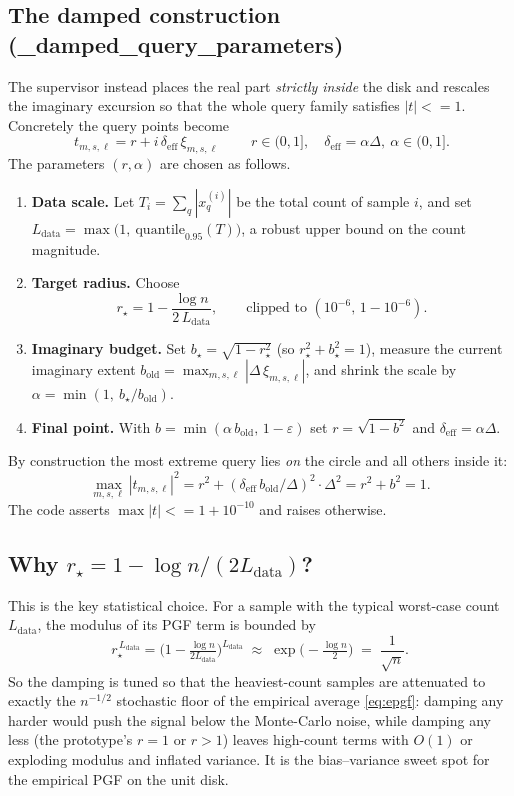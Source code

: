 \documentclass[11pt]{article}
\newcommand{\bt}{\bm{t}}
\newcommand{\bxi}{\bm{\xi}}
\newcommand{\deff}{\delta_{\mathrm{eff}}}
\newcommand{\code}[1]{\texttt{\small #1}}
\def\code#1{#1}%
\def\small{}%
\def\bm#1{#1}%
\def\bt{t}%
\def\le{<=}%
\theoremstyle{definition}
\begin{document}
\subsection{The damped construction (\code{\_damped\_query\_parameters})}
The supervisor instead places the real part \emph{strictly inside} the disk and rescales the
imaginary excursion so that the whole query family satisfies $|\bt|\le1$. Concretely the
query points become
\begin{equation}
\boxed{\;\bt_{m,s,\ell} = r + i\,\deff\,\bxi_{m,s,\ell}\;}
\qquad r\in(0,1],\quad \deff=\alpha\Delta,\ \alpha\in(0,1].
\label{eq:damped}
\end{equation}
The parameters $(r,\alpha)$ are chosen as follows.
\begin{enumerate}[leftmargin=2em, itemsep=2pt]
  \item \textbf{Data scale.} Let $T_i=\sum_q |x^{(i)}_q|$ be the total count of sample $i$, and
        set $L_{\mathrm{data}}=\max\!\big(1,\ \mathrm{quantile}_{0.95}(T)\big)$, a robust upper
        bound on the count magnitude.
  \item \textbf{Target radius.} Choose
        \begin{equation}
        r_\star = 1-\frac{\log n}{2\,L_{\mathrm{data}}},
        \qquad\text{clipped to } (10^{-6},\,1-10^{-6}).
        \label{eq:rstar}
        \end{equation}
  \item \textbf{Imaginary budget.} Set $b_\star=\sqrt{1-r_\star^2}$ (so $r_\star^2+b_\star^2=1$),
        measure the current imaginary extent $b_{\mathrm{old}}=\max_{m,s,\ell}|\Delta\,\bxi_{m,s,\ell}|$,
        and shrink the scale by
        $\alpha=\min(1,\ b_\star/b_{\mathrm{old}})$.
  \item \textbf{Final point.} With $b=\min(\alpha\,b_{\mathrm{old}},\,1-\varepsilon)$ set
        $r=\sqrt{1-b^2}$ and $\deff=\alpha\Delta$.
\end{enumerate}
By construction the most extreme query lies \emph{on} the circle and all others inside it:
\[
\max_{m,s,\ell}|\bt_{m,s,\ell}|^2
 = r^2 + (\deff\,b_{\mathrm{old}}/\Delta)^2\cdot\Delta^2
 = r^2 + b^2 = 1 .
\]
The code asserts $\max|\bt|\le1+10^{-10}$ and raises otherwise.

\subsection{Why $r_\star = 1-\log n/(2L_{\mathrm{data}})$?}
This is the key statistical choice. For a sample with the typical worst-case count
$L_{\mathrm{data}}$, the modulus of its PGF term is bounded by
\[
r_\star^{\,L_{\mathrm{data}}}
=\Big(1-\tfrac{\log n}{2L_{\mathrm{data}}}\Big)^{L_{\mathrm{data}}}
\;\approx\; \exp\!\Big(-\tfrac{\log n}{2}\Big)
\;=\;\frac{1}{\sqrt n}.
\]
So the damping is tuned so that the heaviest-count samples are attenuated to exactly the
$n^{-1/2}$ stochastic floor of the empirical average \eqref{eq:epgf}: damping any harder
would push the signal below the Monte-Carlo noise, while damping any less (the prototype's
$r=1$ or $r>1$) leaves high-count terms with $O(1)$ or exploding modulus and inflated variance.
It is the bias--variance sweet spot for the empirical PGF on the unit disk.
\end{document}
